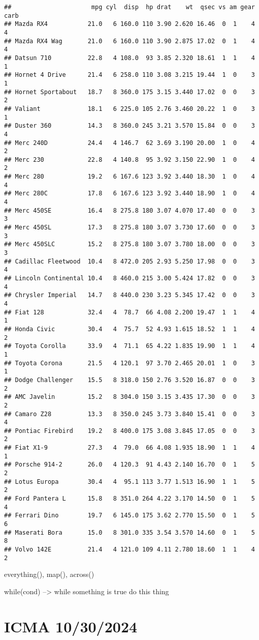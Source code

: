 \documentclass[
]{article}
\begin{document}
\begin{verbatim}
##                      mpg cyl  disp  hp drat    wt  qsec vs am gear carb
## Mazda RX4           21.0   6 160.0 110 3.90 2.620 16.46  0  1    4    4
## Mazda RX4 Wag       21.0   6 160.0 110 3.90 2.875 17.02  0  1    4    4
## Datsun 710          22.8   4 108.0  93 3.85 2.320 18.61  1  1    4    1
## Hornet 4 Drive      21.4   6 258.0 110 3.08 3.215 19.44  1  0    3    1
## Hornet Sportabout   18.7   8 360.0 175 3.15 3.440 17.02  0  0    3    2
## Valiant             18.1   6 225.0 105 2.76 3.460 20.22  1  0    3    1
## Duster 360          14.3   8 360.0 245 3.21 3.570 15.84  0  0    3    4
## Merc 240D           24.4   4 146.7  62 3.69 3.190 20.00  1  0    4    2
## Merc 230            22.8   4 140.8  95 3.92 3.150 22.90  1  0    4    2
## Merc 280            19.2   6 167.6 123 3.92 3.440 18.30  1  0    4    4
## Merc 280C           17.8   6 167.6 123 3.92 3.440 18.90  1  0    4    4
## Merc 450SE          16.4   8 275.8 180 3.07 4.070 17.40  0  0    3    3
## Merc 450SL          17.3   8 275.8 180 3.07 3.730 17.60  0  0    3    3
## Merc 450SLC         15.2   8 275.8 180 3.07 3.780 18.00  0  0    3    3
## Cadillac Fleetwood  10.4   8 472.0 205 2.93 5.250 17.98  0  0    3    4
## Lincoln Continental 10.4   8 460.0 215 3.00 5.424 17.82  0  0    3    4
## Chrysler Imperial   14.7   8 440.0 230 3.23 5.345 17.42  0  0    3    4
## Fiat 128            32.4   4  78.7  66 4.08 2.200 19.47  1  1    4    1
## Honda Civic         30.4   4  75.7  52 4.93 1.615 18.52  1  1    4    2
## Toyota Corolla      33.9   4  71.1  65 4.22 1.835 19.90  1  1    4    1
## Toyota Corona       21.5   4 120.1  97 3.70 2.465 20.01  1  0    3    1
## Dodge Challenger    15.5   8 318.0 150 2.76 3.520 16.87  0  0    3    2
## AMC Javelin         15.2   8 304.0 150 3.15 3.435 17.30  0  0    3    2
## Camaro Z28          13.3   8 350.0 245 3.73 3.840 15.41  0  0    3    4
## Pontiac Firebird    19.2   8 400.0 175 3.08 3.845 17.05  0  0    3    2
## Fiat X1-9           27.3   4  79.0  66 4.08 1.935 18.90  1  1    4    1
## Porsche 914-2       26.0   4 120.3  91 4.43 2.140 16.70  0  1    5    2
## Lotus Europa        30.4   4  95.1 113 3.77 1.513 16.90  1  1    5    2
## Ford Pantera L      15.8   8 351.0 264 4.22 3.170 14.50  0  1    5    4
## Ferrari Dino        19.7   6 145.0 175 3.62 2.770 15.50  0  1    5    6
## Maserati Bora       15.0   8 301.0 335 3.54 3.570 14.60  0  1    5    8
## Volvo 142E          21.4   4 121.0 109 4.11 2.780 18.60  1  1    4    2
\end{verbatim}

everything(), map(), across()

while(cond) --\textgreater{} while something is true do this thing

\section{ICMA 10/30/2024}\label{icma-10302024}
\end{document}
